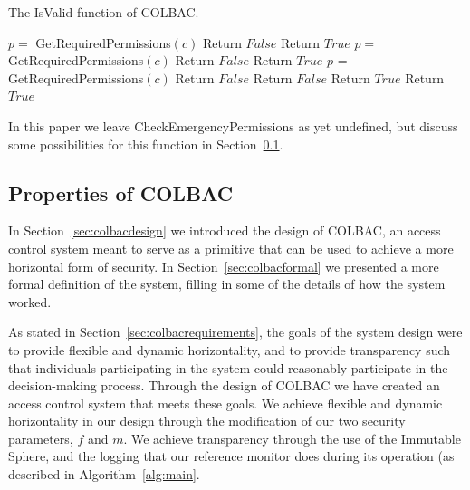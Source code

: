 \begin{algorithm}
\caption{The IsValid function of COLBAC.}
\label{alg:isvalid}
\begin{algorithmic}[1]
         
            \State $p =$ GetRequiredPermissions$(c)$
                \State Return $False$
            \EndIf
        \EndFor
        \State Return $True$
    \Else
        \State $p =$ GetRequiredPermissions$(c)$
            \State Return $False$
        \EndIf
        \State Return $True$
    \EndIf
{}
     
        \State $p$ = GetRequiredPermissions$(c)$
            \State Return $False$
                \State Return $False$
            \EndIf
            \State Return $True$
        \Else {}
            \State Return $True$
        \EndIf
    \EndFor
\EndIf
\EndProcedure
\end{algorithmic}
\end{algorithm}

In this paper we leave CheckEmergencyPermissions as yet undefined, but discuss
some possibilities for this function in Section~\ref{sec:colbacproperties}.

\subsection{Properties of COLBAC}
\label{sec:colbacproperties}
In Section~\ref{sec:colbacdesign} we introduced the design of COLBAC, an access
control system meant to serve as a primitive that can be used to achieve a more
horizontal form of security. In Section~\ref{sec:colbacformal} we presented a
more formal definition of the system, filling in some of the details of how the
system worked.

As stated in Section~\ref{sec:colbacrequirements}, the goals of the system
design were to provide flexible and dynamic horizontality, and to provide
transparency such that individuals participating in the system could reasonably
participate in the decision-making process. Through the design of COLBAC we have
created an access control system that meets these goals. We achieve flexible and
dynamic horizontality in our design through the modification of our two security
parameters, $f$ and $m$. We achieve transparency through the use of the
Immutable Sphere, and the logging that our reference monitor does during its
operation (as described in Algorithm~\ref{alg:main}.

